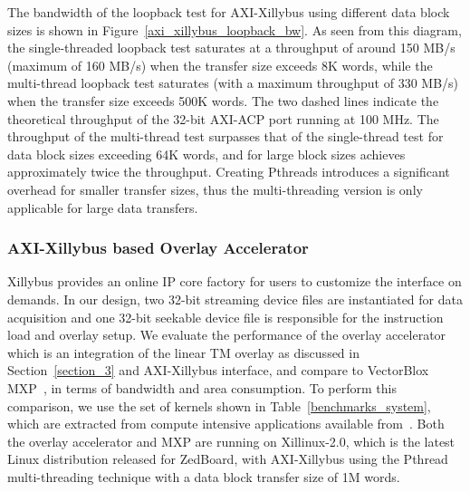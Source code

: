 The bandwidth of the loopback test for AXI-Xillybus using different data block sizes is shown in Figure~\ref{axi_xillybus_loopback_bw}. 
As seen from this diagram, the single-threaded loopback test saturates at a throughput of around 150 MB/s (maximum of 160 MB/s) when the transfer size exceeds 8K words, while the multi-thread loopback test saturates (with a maximum throughput of 330 MB/s) when the transfer size exceeds 500K words. 
The two dashed lines indicate the theoretical throughput of the 32-bit AXI-ACP port running at 100 MHz.
The throughput of the multi-thread test surpasses that of the single-thread test for data block sizes exceeding 64K words, and for large block sizes achieves approximately twice the throughput. 
Creating Pthreads introduces a significant overhead for smaller transfer sizes, thus the multi-threading version is only applicable for large data transfers. 



\subsubsection{AXI-Xillybus based Overlay Accelerator}
Xillybus provides an online IP core factory for users to customize the interface on demands.
In our design, two 32-bit streaming device files are instantiated for data acquisition and one 32-bit seekable device file is responsible for the instruction load and overlay setup. 
We evaluate the performance of the overlay accelerator which is an integration of the linear TM overlay as discussed in Section~\ref{section_3} and AXI-Xillybus interface, and compare to VectorBlox MXP~\cite{severance2013embedded}, in terms of bandwidth and area consumption. 
To perform this comparison, we use the set of kernels shown in Table~\ref{benchmarks_system}, which are extracted from compute intensive applications available from~\cite{gopalakrishnan2007finding, hoy2015performance}. 
Both the overlay accelerator and MXP are running on Xillinux-2.0, which is the latest Linux distribution released for ZedBoard, with AXI-Xillybus using the Pthread multi-threading technique with a data block transfer size of 1M words.

